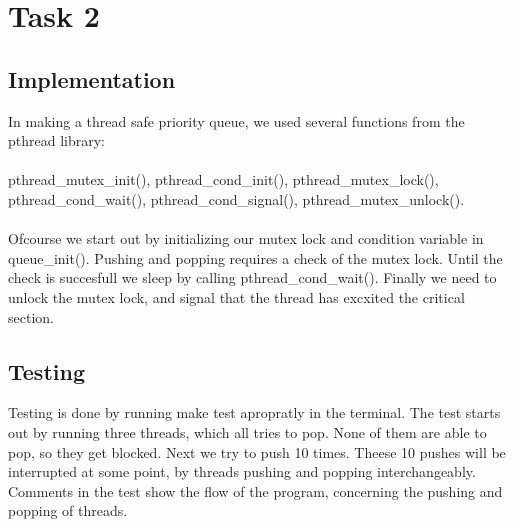 \documentclass[12pt]{article}
\begin{document}
\section*{Task 2}
\subsection*{Implementation}
In making a thread safe priority queue, we used several functions from the pthread library:\\\\ pthread\_mutex\_init(), pthread\_cond\_init(), pthread\_mutex\_lock(), pthread\_cond\_wait(), pthread\_cond\_signal(), pthread\_mutex\_unlock().\\\\
Ofcourse we start out by initializing our mutex lock and condition variable in queue\_init(). Pushing and popping requires a check of the mutex lock. Until the check is succesfull we sleep by calling pthread\_cond\_wait(). Finally we need to unlock the mutex lock, and signal that the thread has excxited the critical section.
\subsection*{Testing}
Testing is done by running make test apropratly in the terminal. The test starts out by running three threads, which all tries to pop. None of them are able to pop, so they get blocked. Next we try to push 10 times. Theese 10 pushes will be interrupted at some point, by threads pushing and popping interchangeably.\\ Comments in the test show the flow of the program, concerning the pushing and popping of threads.
\end{document}
